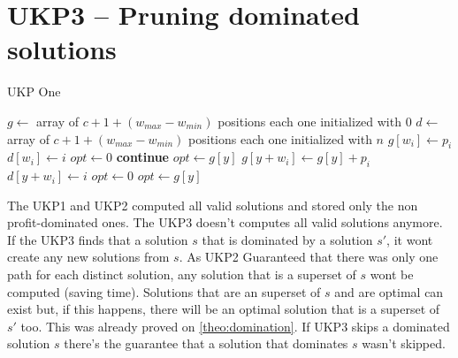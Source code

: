 \documentclass[12pt]{article}
\begin{document}
\section{UKP3 -- Pruning dominated solutions}
\begin{algorithm}
\caption{UKP One}\label{alg:ukp1}
\begin{algorithmic}[1]
  \State \(g \gets\) array of \(c + 1 + (w_{max} - w_{min})\) positions each one initialized with \(0\)\label{ukp3:create_g}
  \State \(d \gets\) array of \(c + 1 + (w_{max} - w_{min})\) positions each one initialized with \(n\)\label{ukp3:create_d}
  \State %
  \label{ukp3:begin_trivial_bounds}
      \State \(g[w_i] \gets p_i\)
      \State \(d[w_i] \gets i\)
    \EndIf
  \EndFor\label{ukp3:end_trivial_bounds}
  \State %
  \State \underline{\(opt \gets 0\)}
  \label{ukp3:main_ext_loop_begin}
    \label{ukp3:if_equal_to_zero}
    	\State \textbf{continue}
    \EndIf\label{ukp3:if_equal_to_zero}
    \State %
    \State \underline{\(opt \gets g[y]\)}
    \State %
    \label{ukp3:main_inner_loop_begin}
      \label{ukp3:if_better_solution_begin}
        \State \(g[y + w_i] \gets g[y] + p_i\)
        \State \(d[y + w_i] \gets i\)
      \EndIf\label{ukp3:if_better_solution_end}
    \EndFor\label{ukp3:main_inner_loop_end}
  \EndFor\label{ukp3:main_ext_loop_end}
  \State %
  \State \sout{\(opt \gets 0\)}
  \label{ukp3:get_opt_loop_begin}
    \label{ukp3:opt_loop_if}
      \State \(opt \gets g[y]\)
    \EndIf
  \EndFor\label{ukp3:get_opt_loop_end}
\EndProcedure
\end{algorithmic}
\end{algorithm}

The UKP1 and UKP2 computed all valid solutions and stored only the non profit-dominated ones. The UKP3 doesn't computes all valid solutions anymore. If the UKP3 finds that a solution \(s\) that is dominated by a solution \(s'\), it wont create any new solutions from \(s\). As UKP2 Guaranteed that there was only one path for each distinct solution, any solution that is a superset of \(s\) wont be computed (saving time). Solutions that are an superset of \(s\) and are optimal can exist but, if this happens, there will be an optimal solution that is a superset of \(s'\) too. This was already proved on \autoref{theo:domination}. If UKP3 skips a dominated solution \(s\) there's the guarantee that a solution that dominates \(s\) wasn't skipped.
\end{document}
